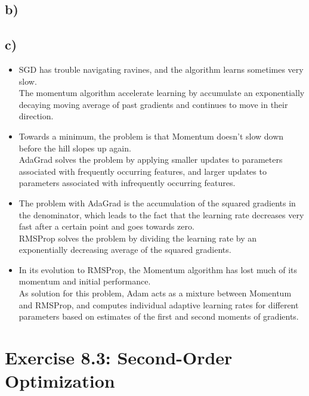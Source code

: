 \documentclass[a4paper]{article}
\begin{document}
    
    \subsection*{b)}
        


    \subsection*{c)}
        \begin{itemize}
            \item SGD has trouble navigating ravines, and the algorithm learns sometimes very slow.\\
                The momentum algorithm accelerate learning by accumulate an exponentially decaying moving average of past gradients and continues to move in their direction.
            \item Towards a minimum, the problem is that Momentum doesn't slow down before the hill slopes up again.\\
                AdaGrad solves the problem by applying smaller updates to parameters associated with frequently occurring features, and larger updates to parameters associated with infrequently occurring features.
            \item The problem with AdaGrad is the accumulation of the squared gradients in the denominator, which leads to the fact that the learning rate decreases very fast after a certain point and goes towards zero.\\ 
                RMSProp solves the problem by dividing the learning rate by an exponentially decreasing average of the squared gradients.
            \item In its evolution to RMSProp, the Momentum algorithm has lost much of its momentum and initial performance.\\
                As solution for this problem, Adam acts as a mixture between Momentum and RMSProp, and computes individual adaptive learning rates for different parameters based on estimates of the first and second moments of gradients.
        \end{itemize}




\newpage
\section*{Exercise 8.3: Second-Order Optimization}
\end{document}
